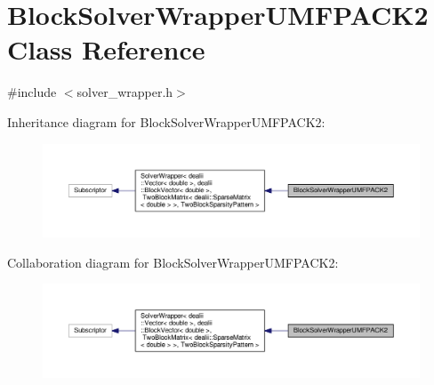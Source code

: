 \hypertarget{class_block_solver_wrapper_u_m_f_p_a_c_k2}{}\section{Block\+Solver\+Wrapper\+U\+M\+F\+P\+A\+C\+K2 Class Reference}
\label{class_block_solver_wrapper_u_m_f_p_a_c_k2}


{\ttfamily \#include $<$solver\+\_\+wrapper.\+h$>$}



Inheritance diagram for Block\+Solver\+Wrapper\+U\+M\+F\+P\+A\+C\+K2\+:\nopagebreak
\begin{figure}[H]
\begin{center}
\leavevmode
\includegraphics[width=350pt]{class_block_solver_wrapper_u_m_f_p_a_c_k2__inherit__graph}
\end{center}
\end{figure}


Collaboration diagram for Block\+Solver\+Wrapper\+U\+M\+F\+P\+A\+C\+K2\+:\nopagebreak
\begin{figure}[H]
\begin{center}
\leavevmode
\includegraphics[width=350pt]{class_block_solver_wrapper_u_m_f_p_a_c_k2__coll__graph}
\end{center}
\end{figure}
